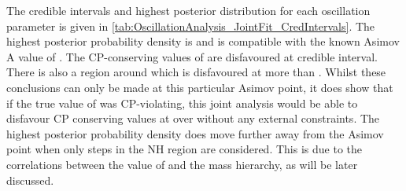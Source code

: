 The credible intervals and highest posterior distribution for each oscillation parameter is given in \autoref{tab:OscillationAnalysis_JointFit_CredIntervals}. The highest posterior probability density is  and is compatible with the known Asimov A value of . The CP-conserving values of  are disfavoured at \quickmath{1\sigma} credible interval. There is also a region around  which is disfavoured at more than \quickmath{3\sigma}. Whilst these conclusions can only be made at this particular Asimov point, it does show that if the true value of  was CP-violating, this joint analysis would be able to disfavour CP conserving values at over \quickmath{1\sigma} without any external constraints. The highest posterior probability density does move further away from the Asimov point when only steps in the NH region are considered. This is due to the correlations between the value of  and the mass hierarchy, as will be later discussed.

